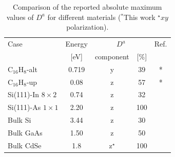 \documentclass[pss]{wiley2sp} %
\begin{document}
\begin{table}[b]
  \sidecaption
  \begin{tabular}{lcccc}
  \hline
  Case & Energy &  \multicolumn{2}{c}{$D^{a}$} &  Ref.\\
  \cline{3-4}
  & [eV]   & component & [\%] \\
  \hline
  C$_{16}$H$_{8}$-alt  & 0.719& y & 39     & * \\
  C$_{16}$H$_{8}$-up   & 0.08 & z & 57     & * \\
  Si(111)-In $8\times2$& 0.74 & z & 32     & \cite{arzate2014optical}  \\
  Si(111)-As $1\times1$& 2.20 & z & 100    & \cite{mendoza2012optical} \\
  Bulk Si              & 3.44 & z & 30     & \cite{nastos2007full}     \\
  Bulk GaAs            & 1.50 & z & 50     & \cite{nastos2007full,bhat2005excitonic} \\
  Bulk CdSe            & 1.8  & z$^{\star}$ & 100& \cite{nastos2007full}\\
  \hline
  \end{tabular}
  \caption[]{%
  Comparison of the reported absolute maximum values of {$D^{a}$} for different materials ($^{*}$This work $^{\star}xy$ polarization).}
  \label{tab:dacomp}
\end{table}
\end{document}
